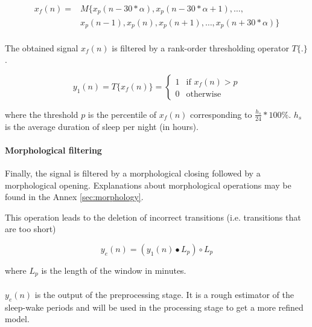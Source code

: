 \documentclass[a4paper,10pt]{article}
\begin{document}
\begin{equation}
\begin{split}
x_f(n) = & M\{x_p(n - 30 * \alpha), x_p(n - 30 * \alpha + 1), \ldots,\\
         & x_p(n - 1), x_p(n), x_p(n+1), \ldots, x_p(n + 30 * \alpha)\}
\end{split}
\end{equation}

\paragraph{}
\label{T-threshold}
The obtained signal $x_f(n)$ is filtered by a rank-order thresholding operator $T\{.\}$.

\begin{equation}
y_1(n) = T\{x_f(n)\} = \left\{
    \begin{array}{ll}
        1 & \mbox{if } x_f(n) > p \\
        0 & \mbox{otherwise}
    \end{array}
\right.
\end{equation}

where the threshold $p$ is the percentile of $x_f(n)$ corresponding to $\frac{h_s}{24}*100\%$. $h_s$ is the average duration of sleep per night (in hours).

\paragraph{Morphological filtering}
\label{closing-opening}
Finally, the signal is filtered by a morphological closing followed by a morphological opening. Explanations about morphological operations may be found in the Annex \ref{sec:morphology}.

This operation leads to the deletion of incorrect transitions (i.e. transitions that are too short)

\begin{equation}
y_e(n) = (y_1(n) \bullet L_p) \circ L_p
\end{equation}

where $L_p$ is the length of the window in minutes.

\paragraph{}
$y_e(n)$ is the output of the preprocessing stage. It is a rough estimator of the sleep-wake periods and will be used in the processing stage to get a more refined model.
\end{document}
